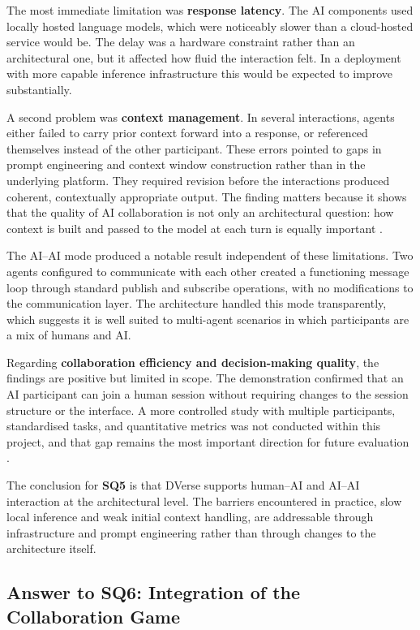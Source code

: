 \documentclass[11pt]{article}
\begin{document}
The most immediate limitation was \textbf{response latency}. The AI components used locally hosted language models, which were noticeably slower than a cloud-hosted service would be. The delay was a hardware constraint rather than an architectural one, but it affected how fluid the interaction felt. In a deployment with more capable inference infrastructure this would be expected to improve substantially.

A second problem was \textbf{context management}. In several interactions, agents either failed to carry prior context forward into a response, or referenced themselves instead of the other participant. These errors pointed to gaps in prompt engineering and context window construction rather than in the underlying platform. They required revision before the interactions produced coherent, contextually appropriate output. The finding matters because it shows that the quality of AI collaboration is not only an architectural question: how context is built and passed to the model at each turn is equally important \cite{bommasani2021,guo2024}.

The AI--AI mode produced a notable result independent of these limitations. Two agents configured to communicate with each other created a functioning message loop through standard publish and subscribe operations, with no modifications to the communication layer. The architecture handled this mode transparently, which suggests it is well suited to multi-agent scenarios in which participants are a mix of humans and AI.

Regarding \textbf{collaboration efficiency and decision-making quality}, the findings are positive but limited in scope. The demonstration confirmed that an AI participant can join a human session without requiring changes to the session structure or the interface. A more controlled study with multiple participants, standardised tasks, and quantitative metrics was not conducted within this project, and that gap remains the most important direction for future evaluation \cite{guo2024,amershi2019}.

The conclusion for \textbf{SQ5} is that DVerse supports human--AI and AI--AI interaction at the architectural level. The barriers encountered in practice, slow local inference and weak initial context handling, are addressable through infrastructure and prompt engineering rather than through changes to the architecture itself.

\subsection{Answer to SQ6: Integration of the Collaboration Game}
\end{document}
